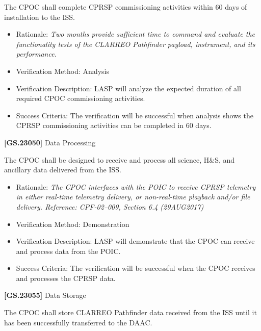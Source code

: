 The \gls{CPOC} shall complete \gls{CPRSP} commissioning activities within 60 days of installation to the \gls{ISS}.

\begin{itemize}
\item{} Rationale: \emph{Two months provide sufficient time to command and evaluate the functionality tests of the CLARREO Pathfinder payload, instrument, and its performance.}

\item{} Verification Method: Analysis

\item{} Verification Description: \gls{LASP} will analyze the expected duration of all required \gls{CPOC} commissioning activities.

\item{} Success Criteria: The verification will be successful when \gls{analysis} shows the \gls{CPRSP} commissioning activities can be completed in 60 days.

\end{itemize}

\textbf{[GS.23050]} Data Processing

The \gls{CPOC} shall be designed to receive and process all science, H\&S, and ancillary data delivered from the \gls{ISS}.

\begin{itemize}
\item{} Rationale: \emph{The CPOC interfaces with the POIC to receive CPRSP telemetry in either real-time telemetry delivery, or non-real-time playback and\slash or file delivery. Reference: CPF-02--009, Section 6.4 (29AUG2017)}

\item{} Verification Method: Demonstration

\item{} Verification Description: \gls{LASP} will demonstrate that the \gls{CPOC} can receive and process data from the \gls{POIC}.

\item{} Success Criteria: The verification will be successful when the \gls{CPOC} receives and processes the \gls{CPRSP} data.

\end{itemize}

\textbf{[GS.23055]} Data Storage

The \gls{CPOC} shall store \gls{CLARREO} Pathfinder data received from the \gls{ISS} until it has been successfully transferred to the \gls{DAAC}.

